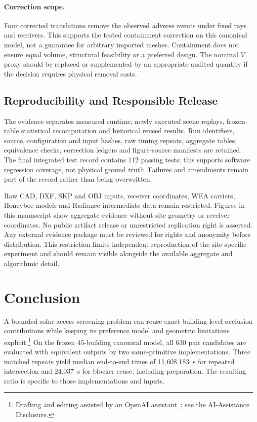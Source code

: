 \documentclass{llncs}
\newcommand{\aidraft}{\footnote{Drafting and editing assisted by an OpenAI assistant~\cite{openai2026}; see the AI-Assistance Disclosure.}}
\begin{document}
\paragraph{Correction scope.} Four corrected translations remove the observed adverse events under fixed rays and receivers. This supports the tested containment correction on this canonical model, not a guarantee for arbitrary imported meshes. Containment does not ensure equal volume, structural feasibility or a preferred design. The nominal $V$ proxy should be replaced or supplemented by an appropriate audited quantity if the decision requires physical removal costs.

\subsection{Reproducibility and Responsible Release}
The evidence separates measured runtime, newly executed scene replays, frozen-table statistical recomputation and historical reused results. Run identifiers, source, configuration and input hashes, raw timing repeats, aggregate tables, equivalence checks, correction ledgers and figure-source manifests are retained. The final integrated test record contains 112 passing tests; this supports software regression coverage, not physical ground truth. Failures and amendments remain part of the record rather than being overwritten.

Raw CAD, DXF, SKP and OBJ inputs, receiver coordinates, WEA carriers, Honeybee models and Radiance intermediate data remain restricted. Figures in this manuscript show aggregate evidence without site geometry or receiver coordinates. No public artifact release or unrestricted replication right is asserted. Any external evidence package must be reviewed for rights and anonymity before distribution. This restriction limits independent reproduction of the site-specific experiment and should remain visible alongside the available aggregate and algorithmic detail.

\section{Conclusion}
A bounded solar-access screening problem can reuse exact building-level occlusion contributions while keeping its preference model and geometric limitations explicit.\aidraft{} On the frozen 45-building canonical model, all 630 pair candidates are evaluated with equivalent outputs by two same-primitive implementations. Three matched repeats yield median end-to-end times of 11,608.183~s for repeated intersection and 24.037~s for blocker reuse, including preparation. The resulting ratio is specific to those implementations and inputs.
\end{document}
